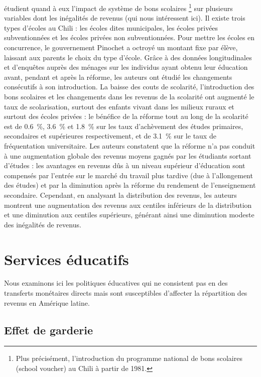 \documentclass[pagesize, twoside=off, bibliography=totoc, DIV=calc, fontsize=12pt, a4paper, french]{scrartcl}
\begin{document}
 étudient quand à eux l’impact de système de bons scolaires \footnote{Plus précisément, l’introduction du programme national de bons scolaires (\og{}school voucher\fg{}) au Chili à partir de 1981.} sur plusieurs variables dont les inégalités de revenus (qui nous intéressent ici). Il existe trois types d’écoles au Chili : les écoles dites municipales, les écoles privées subventionnées et les écoles privées non subventionnées. Pour mettre les écoles en concurrence, le gouvernement Pinochet a octroyé un montant fixe par élève, laissant aux parents le choix du type d’école. Grâce à des données longitudinales et d'enquêtes auprès des ménages sur les individus ayant obtenu leur éducation avant, pendant et après la réforme, les auteurs ont étudié les changements consécutifs à son introduction. La baisse des couts de scolarité, l’introduction des bons scolaires et les changements dans les revenus de la scolarité ont augmenté le taux de scolarisation, surtout des enfants vivant dans les milieux ruraux et surtout des écoles privées : le bénéfice de la réforme tout au long de la scolarité est de \SI{0.6}{\percent}, \SI{3.6}{\percent} et \SI{1.8}{\percent} sur les taux d’achèvement des études primaires, secondaires et supérieures respectivement, et de \SI{3.1}{\percent} sur le taux de fréquentation universitaire. Les auteurs constatent que la réforme n’a pas conduit à une augmentation globale des revenus moyens gagnés par les étudiants sortant d’études : les avantages en revenus dûs à un niveau supérieur d’éducation sont compensés par l’entrée sur le marché du travail plus tardive (due à l’allongement des études) et par la diminution après la réforme du rendement de l’enseignement secondaire. Cependant, en analysant la distribution des revenus, les auteurs montrent une augmentation des revenus aux centiles inférieurs de la distribution et une diminution aux centiles supérieurs, générant ainsi une diminution modeste des inégalités de revenus. 

\section{Services éducatifs}

\label{sec_svc}

Nous examinons ici les politiques éducatives qui ne consistent pas en des transferts monétaires directs mais sont susceptibles d’affecter la répartition des revenus en Amérique latine. 

\subsection{Effet de garderie}
\end{document}
